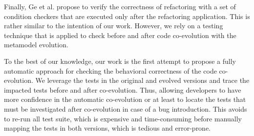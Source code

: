 Finally, Ge et al. \cite{ge2014Manual} propose to verify the correctness of refactoring with a set of condition checkers that are executed only after the refactoring application. This is rather similar to the intention of our work. However, we rely on a testing technique that is applied to check before and after code co-evolution with the metamodel evolution. 


To the best of our knowledge, our work is the first attempt to propose a fully automatic approach for checking the behavioral correctness of the code co-evolution. We leverage the tests in the original and evolved versions and trace the impacted tests before and after co-evolution. Thus, allowing developers to have more confidence in the automatic co-evolution or at least to locate the tests that must be investigated after co-evolution in case of a bug introduction. This avoids to re-run all test suite, which is expensive and time-consuming before manually mapping the tests in both versions, which is tedious and error-prone. 

